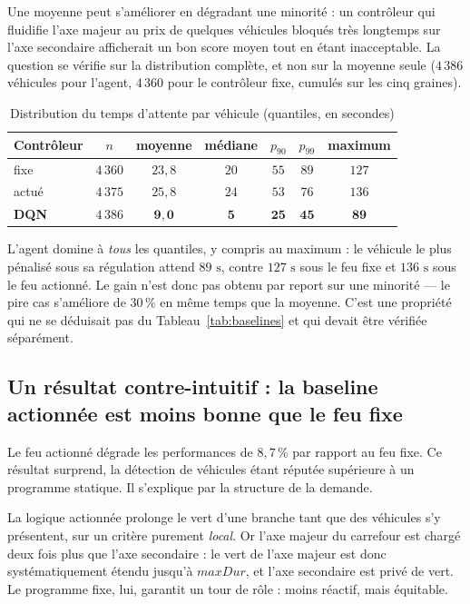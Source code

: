 \documentclass[11pt,a4paper]{article}
\begin{document}
Une moyenne peut s'améliorer en dégradant une minorité : un contrôleur qui fluidifie
l'axe majeur au prix de quelques véhicules bloqués très longtemps sur l'axe secondaire
afficherait un bon score moyen tout en étant inacceptable. La question se vérifie sur
la distribution complète, et non sur la moyenne seule ($4\,386$ véhicules pour l'agent,
$4\,360$ pour le contrôleur fixe, cumulés sur les cinq graines).

\begin{table}[H]
\centering
\caption{Distribution du temps d'attente par véhicule (quantiles, en secondes)}
\label{tab:quantiles}
\vspace{0.2cm}
\begin{tabular}{lcccccc}
\toprule
\textbf{Contrôleur} & \textbf{$n$} & \textbf{moyenne} & \textbf{médiane} & \textbf{$p_{90}$} & \textbf{$p_{99}$} & \textbf{maximum} \\
\midrule
fixe   & $4\,360$ & $23{,}8$ & $20$ & $55$ & $89$ & $127$ \\
actué  & $4\,375$ & $25{,}8$ & $24$ & $53$ & $76$ & $136$ \\
\textbf{DQN} & $4\,386$ & $\mathbf{9{,}0}$ & $\mathbf{5}$ & $\mathbf{25}$ & $\mathbf{45}$ & $\mathbf{89}$ \\
\bottomrule
\end{tabular}
\end{table}

L'agent domine à \emph{tous} les quantiles, y compris au maximum : le véhicule le plus
pénalisé sous sa régulation attend $89\text{ s}$, contre $127\text{ s}$ sous le feu
fixe et $136\text{ s}$ sous le feu actionné. Le gain n'est donc pas obtenu par
report sur une minorité --- le pire cas s'améliore de $30\,\%$ en même temps que la
moyenne. C'est une propriété qui ne se déduisait pas du Tableau~\ref{tab:baselines} et
qui devait être vérifiée séparément.

\subsection{Un résultat contre-intuitif : la baseline actionnée est moins bonne que le feu fixe}

Le feu actionné dégrade les performances de $8{,}7\,\%$ par rapport au feu fixe. Ce
résultat surprend, la détection de véhicules étant réputée supérieure à un programme
statique. Il s'explique par la structure de la demande.

La logique actionnée prolonge le vert d'une branche tant que des véhicules s'y
présentent, sur un critère purement \emph{local}. Or l'axe majeur du carrefour est
chargé deux fois plus que l'axe secondaire : le vert de l'axe majeur est donc
systématiquement étendu jusqu'à $maxDur$, et l'axe secondaire est privé de vert. Le
programme fixe, lui, garantit un tour de rôle : moins réactif, mais équitable.
\end{document}
